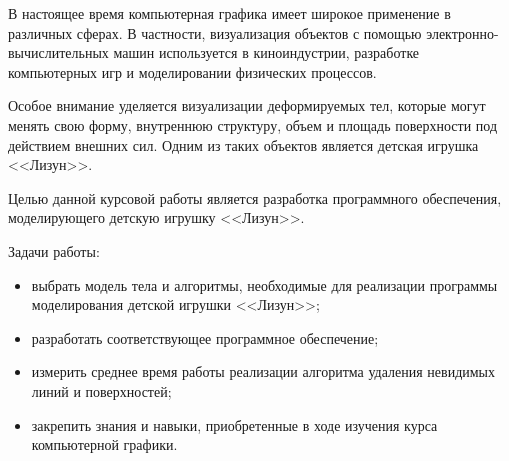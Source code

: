 
В настоящее время компьютерная графика имеет широкое применение в
различных сферах. В частности, визуализация объектов с помощью электронно-вычислительных машин используется в киноиндустрии, разработке компьютерных
игр и моделировании физических процессов.

Особое внимание уделяется визуализации деформируемых тел, которые
могут менять свою форму, внутреннюю структуру, объем и площадь поверхности
под действием внешних сил. Одним из таких объектов является детская игрушка
<<Лизун>>.

Целью данной курсовой работы является разработка программного обеспечения, моделирующего детскую игрушку <<Лизун>>.

Задачи работы:
\begin{itemize}
	\item выбрать модель тела и алгоритмы, необходимые для реализации программы моделирования детской игрушки <<Лизун>>;
	\item разработать соответствующее программное обеспечение;
	\item измерить среднее время работы реализации алгоритма удаления невидимых линий и поверхностей;
	\item закрепить знания и навыки, приобретенные в ходе изучения курса компьютерной графики.
\end{itemize}

\clearpage
